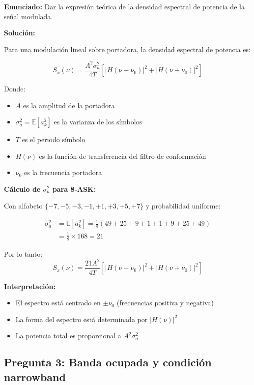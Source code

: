 \documentclass[11pt,a4paper]{article}
\begin{document}
\textbf{Enunciado:} Dar la expresi\'on te\'orica de la densidad espectral de potencia de la se\~nal modulada.

\vspace{0.3cm}
\textbf{Soluci\'on:}

Para una modulaci\'on lineal sobre portadora, la densidad espectral de potencia es:

\[
\boxed{S_x(\nu) = \frac{A^2 \sigma_a^2}{4T}\left[|H(\nu - \nu_0)|^2 + |H(\nu + \nu_0)|^2\right]}
\]

Donde:
\begin{itemize}
    \item $A$ es la amplitud de la portadora
    \item $\sigma_a^2 = \mathbb{E}[a_k^2]$ es la varianza de los s\'imbolos
    \item $T$ es el periodo s\'imbolo
    \item $H(\nu)$ es la funci\'on de transferencia del filtro de conformaci\'on
    \item $\nu_0$ es la frecuencia portadora
\end{itemize}

\textbf{C\'alculo de $\sigma_a^2$ para 8-ASK:}

Con alfabeto $\{-7, -5, -3, -1, +1, +3, +5, +7\}$ y probabilidad uniforme:

\begin{align*}
\sigma_a^2 &= \mathbb{E}[a_k^2] = \frac{1}{8}(49 + 25 + 9 + 1 + 1 + 9 + 25 + 49) \\
&= \frac{1}{8} \times 168 = 21
\end{align*}

Por lo tanto:
\[
\boxed{S_x(\nu) = \frac{21A^2}{4T}\left[|H(\nu - \nu_0)|^2 + |H(\nu + \nu_0)|^2\right]}
\]

\textbf{Interpretaci\'on:}
\begin{itemize}
    \item El espectro est\'a centrado en $\pm\nu_0$ (frecuencias positiva y negativa)
    \item La forma del espectro est\'a determinada por $|H(\nu)|^2$
    \item La potencia total es proporcional a $A^2\sigma_a^2$
\end{itemize}



\subsection*{Pregunta 3: Banda ocupada y condici\'on narrowband}
\end{document}
